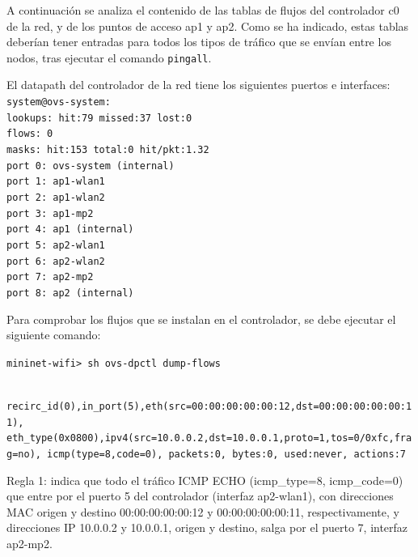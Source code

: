 \documentclass[a4paper,12pt,twoside,spanish]{book}
\begin{document}
A continuación se analiza el contenido de las tablas de flujos del controlador c0 de la red, y de los puntos de acceso ap1 y ap2. Como se ha indicado, estas tablas deberían tener entradas para todos los tipos de tráfico que se envían entre los nodos, tras ejecutar el comando \texttt{pingall}.\par 

\hspace{0.5cm}

El datapath del controlador de la red tiene los siguientes puertos e interfaces:
\texttt{\\
\noindent system@ovs-system:\\
	\indent lookups: hit:79 missed:37 lost:0\\
	\indent	flows: 0\\
	\indent	masks: hit:153 total:0 hit/pkt:1.32\\
	\indent	port 0: ovs-system (internal)\\
	\indent	port 1: ap1-wlan1\\
	\indent	port 2: ap1-wlan2\\
	\indent	port 3: ap1-mp2\\
	\indent	port 4: ap1 (internal)\\
	\indent	port 5: ap2-wlan1\\
	\indent	port 6: ap2-wlan2\\
	\indent	port 7: ap2-mp2\\
	\indent	port 8: ap2 (internal)\\
}\par

Para comprobar los flujos que se instalan en el controlador, se debe ejecutar el siguiente comando:\par 

\begin{center} 
	\texttt{mininet-wifi> sh ovs-dpctl dump-flows}
\end{center}

\noindent\texttt{
	recirc\_id(0),in\_port(5),eth(src=00:00:00:00:00:12,dst=00:00:00:00:00:11),
	eth\_type(0x0800),ipv4(src=10.0.0.2,dst=10.0.0.1,proto=1,tos=0/0xfc,frag=no),
	icmp(type=8,code=0), packets:0, bytes:0, 	used:never, actions:7
}

Regla 1: indica que todo el tráfico ICMP ECHO (icmp\_type=8, icmp\_code=0) que entre por el puerto 5 del controlador (interfaz ap2-wlan1), con direcciones MAC origen y destino 00:00:00:00:00:12 y 00:00:00:00:00:11, respectivamente, y direcciones IP 10.0.0.2 y 10.0.0.1, origen y destino, salga por el puerto 7, interfaz ap2-mp2.\par 
\end{document}
